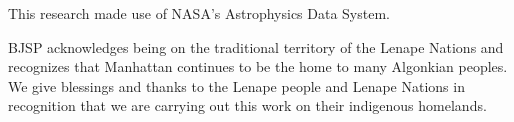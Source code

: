 \documentclass[modern]{aastex63}
\begin{document}
This research made use of NASA's Astrophysics Data System.

BJSP acknowledges being on the traditional territory of the Lenape Nations and recognizes that Manhattan continues to be the home to many Algonkian peoples. We give blessings and thanks to the Lenape people and Lenape Nations in recognition that we are carrying out this work on their indigenous homelands.
%








\end{document}
